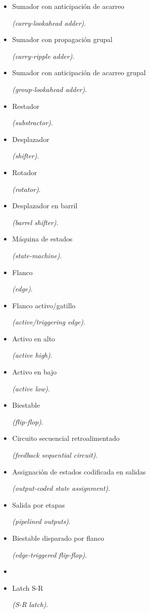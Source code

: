 \begin{itemize}
    \item \hypertarget{carry-lookahead_adder}{Sumador con anticipación de acarreo} \emph{(carry-lookahead adder)}.
    \item \hypertarget{group-ripple_adder}{Sumador con propagación grupal} \emph{(carry-ripple adder)}.
    \item \hypertarget{group-lookahead_adder}{Sumador con anticipación de acarreo grupal} \emph{(group-lookahead adder)}.
    \item \hypertarget{substractor}{Restador} \emph{(substractor)}.
    \item \hypertarget{shifter}{Desplazador} \emph{(shifter)}.
    \item \hypertarget{rotator}{Rotador} \emph{(rotator)}.
    \item \hypertarget{barrel_shifter}{Desplazador en barril} \emph{(barrel shifter)}.
    \item \hypertarget{state_machine}{Máquina de estados} \emph{(state-machine)}.
    \item \hypertarget{edge}{Flanco} \emph{(edge)}.
    \item \hypertarget{active_edge}{Flanco activo/gatillo} \emph{(active/triggering edge)}.
    \item \hypertarget{active_high}{Activo en alto} \emph{(active high)}.
    \item \hypertarget{active_low}{Activo en bajo} \emph{(active low)}.
    \item \hypertarget{flip-flop}{Biestable} \emph{(flip-flop)}.
    \item \hypertarget{feedback_sequential_circuit}{Circuito secuencial retroalimentado} \emph{(feedback sequential circuit)}.
    \item \hypertarget{output-coded_state_assignment}{Assignación de estados codificada en salidas} \emph{(output-coded state assignment)}.
    \item \hypertarget{pipelined_outputs}{Salida por etapas} \emph{(pipelined outputs)}.
    \item \hypertarget{edge-triggered_flip-flop}{Biestable disparado por flanco} \emph{(edge-triggered flip-flop)}.
    \item \item \hypertarget{sr_latch}{Latch S-R} \emph{(S-R latch)}.
\end{itemize}